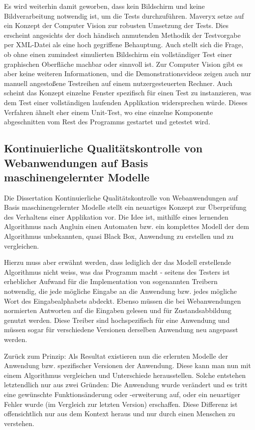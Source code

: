 Es wird weiterhin damit geworben, dass kein Bildschirm und keine Bildverarbeitung
notwendig ist, um die Tests durchzuführen. Maveryx setze auf ein 
Konzept der \glqq{}Computer Vision\grqq{} zur robusten Umsetzung der
Tests. Dies erscheint angesichts der doch händisch anmutenden Methodik
der Testvorgabe per XML-Datei als eine hoch gegriffene Behauptung. Auch stellt
sich die Frage, ob ohne einen zumindest simulierten Bildschirm ein vollständiger
Test einer graphischen Oberfläche machbar oder sinnvoll ist. Zur Computer
Vision gibt es aber keine weiteren Informationen, und die Demonstrationsvideos
zeigen auch nur manuell angestoßene Testreihen auf einem nutzergesteuerten Rechner.
Auch scheint das Konzept einzelne Fenster spezifisch für einen Test zu instanzieren,
was dem Test einer vollständigen laufenden Applikation widersprechen würde. Dieses
Verfahren ähnelt eher einem Unit-Test, wo eine einzelne Komponente abgeschnitten
vom Rest des Programms gestartet und getestet wird.


\vspace{0.5cm}

\subsection{Kontinuierliche Qualitätskontrolle von Webanwendungen auf Basis 
maschinengelernter Modelle}\label{ssection:windmueller}


Die \glqq{}Dissertation Kontinuierliche Qualitätskontrolle von Webanwendungen auf 
Basis maschinengelernter Modelle\grqq{} \cite{diss:windmueller} stellt ein neuartiges Konzept
zur Überprüfung des Verhaltens einer Applikation vor. Die Idee ist, mithilfe eines
lernenden Algorithmus nach Angluin \cite{angluin} einen Automaten bzw. ein komplettes Modell
der dem Algorithmus unbekannten, quasi \glqq{}Black Box\grqq{}, Anwendung zu erstellen und zu vergleichen.

Hierzu muss aber erwähnt werden, dass lediglich der das Modell erstellende Algorithmus nicht
weiss, was das Programm macht - seitens des Testers ist erheblicher Aufwand für die Implementation
von sogenannten Treibern notwendig, die jede mögliche Eingabe an die Anwendung bzw. jedes
mögliche Wort des Eingabealphabets abdeckt. Ebenso müssen die bei Webanwendungen normierten
Antworten auf die Eingaben gelesen und für Zustandsabbildung genutzt werden. Diese Treiber
sind hochspezifisch für eine Anwendung und müssen sogar für verschiedene Versionen derselben
Anwendung neu angepasst werden.

Zurück zum Prinzip: Als Resultat existieren nun die erlernten Modelle der Anwendung bzw. spezifischer
Versionen der Anwendung. Diese kann man nun mit einem Algorithmus vergleichen und Unterschiede
herausstellen. Solche entstehen letztendlich nur aus zwei Gründen: Die Anwendung wurde verändert
und es tritt eine gewünschte Funktionsänderung oder -erweiterung auf, oder ein neuartiger Fehler
wurde (im Vergleich zur letzten Version) erschaffen. Diese Differenz ist offensichtlich nur
aus dem Kontext heraus und nur durch einen Menschen zu verstehen.

